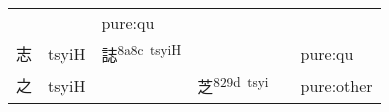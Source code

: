 \documentclass[14pt,a4paper]{scrartcl}
\begin{document}
\begin{longtable}[c]{@{}llllll@{}}
\begin{minipage}[t]{0.14\columnwidth}\raggedright\strut
\strut\end{minipage} &
\begin{minipage}[t]{0.14\columnwidth}\raggedright\strut
\strut\end{minipage} &
\begin{minipage}[t]{0.14\columnwidth}\raggedright\strut
pure:qu
\strut\end{minipage}\tabularnewline
\begin{minipage}[t]{0.14\columnwidth}\raggedright\strut
志
\strut\end{minipage} &
\begin{minipage}[t]{0.14\columnwidth}\raggedright\strut
tsyiH
\strut\end{minipage} &
\begin{minipage}[t]{0.14\columnwidth}\raggedright\strut
誌\textsuperscript{8a8c~tsyiH}
\strut\end{minipage} &
\begin{minipage}[t]{0.14\columnwidth}\raggedright\strut
\strut\end{minipage} &
\begin{minipage}[t]{0.14\columnwidth}\raggedright\strut
\strut\end{minipage} &
\begin{minipage}[t]{0.14\columnwidth}\raggedright\strut
pure:qu
\strut\end{minipage}\tabularnewline
\begin{minipage}[t]{0.14\columnwidth}\raggedright\strut
之
\strut\end{minipage} &
\begin{minipage}[t]{0.14\columnwidth}\raggedright\strut
tsyiH
\strut\end{minipage} &
\begin{minipage}[t]{0.14\columnwidth}\raggedright\strut
\strut\end{minipage} &
\begin{minipage}[t]{0.14\columnwidth}\raggedright\strut
芝\textsuperscript{829d~tsyi}
\strut\end{minipage} &
\begin{minipage}[t]{0.14\columnwidth}\raggedright\strut
\strut\end{minipage} &
\begin{minipage}[t]{0.14\columnwidth}\raggedright\strut
pure:other
\strut\end{minipage}\tabularnewline
\bottomrule
\end{longtable}
\end{document}
